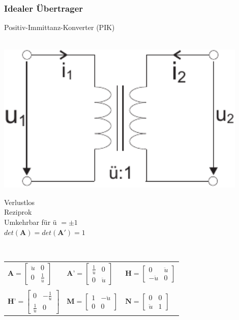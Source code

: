 \documentclass[a4paper,twocolumn,10pt]{article}
\begin{document}
\subsubsection*{Idealer Übertrager}
Positiv-Immittanz-Konverter (PIK)\\\\
\begin{minipage}[b]{0.2\textwidth}
\includegraphics[width=0.9\textwidth]{img/OP_Uebertrager}
\end{minipage}
\hfill
\begin{minipage}[b]{0.26\textwidth}
Verlustlos\\
Reziprok\\
Umkehrbar für ü $=\pm 1$\\
$det(\textbf{A})=det(\textbf{A}')=1$\\
\end{minipage}\\

\begin{tabular}{lll}
$\textbf{A}=\begin{bmatrix}\ddot{u} & 0\\ 0 & \frac{1}{\ddot{u}}\end{bmatrix}$ & $\textbf{A'}=\begin{bmatrix}\frac{1}{\ddot{u}} & 0\\ 0 & \ddot{u}\end{bmatrix}$ & $\textbf{H}=\begin{bmatrix}0 & \ddot{u}\\ -\ddot{u} & 0\end{bmatrix}$\\\\
$\textbf{H'}=\begin{bmatrix}0 & -\frac{1}{\ddot{u}}\\ \frac{1}{\ddot{u}} & 0\end{bmatrix}$ & $\textbf{M}=\begin{bmatrix}1 & -\ddot{u}\\ 0 & 0\end{bmatrix}$ & $\textbf{N}=\begin{bmatrix}0 & 0\\ \ddot{u} & 1\end{bmatrix}$
\end{tabular}
\end{document}
